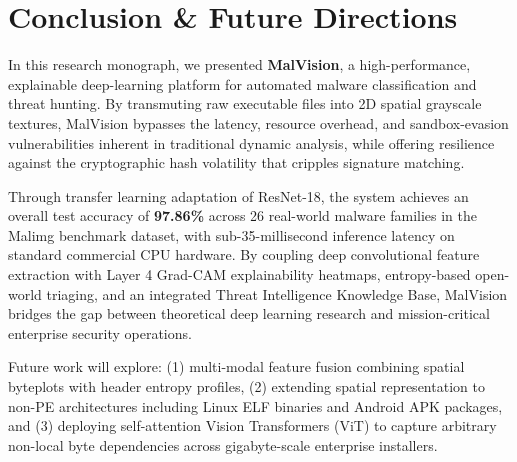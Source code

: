 \documentclass[journal,10pt,twocolumn]{IEEEtran}
\begin{document}
\section{Conclusion \& Future Directions}
In this research monograph, we presented \textbf{MalVision}, a high-performance, explainable deep-learning platform for automated malware classification and threat hunting. By transmuting raw executable files into 2D spatial grayscale textures, MalVision bypasses the latency, resource overhead, and sandbox-evasion vulnerabilities inherent in traditional dynamic analysis, while offering resilience against the cryptographic hash volatility that cripples signature matching.

Through transfer learning adaptation of ResNet-18, the system achieves an overall test accuracy of \textbf{97.86\%} across 26 real-world malware families in the Malimg benchmark dataset, with sub-35-millisecond inference latency on standard commercial CPU hardware. By coupling deep convolutional feature extraction with Layer 4 Grad-CAM explainability heatmaps, entropy-based open-world triaging, and an integrated Threat Intelligence Knowledge Base, MalVision bridges the gap between theoretical deep learning research and mission-critical enterprise security operations.

Future work will explore: (1) multi-modal feature fusion combining spatial byteplots with header entropy profiles, (2) extending spatial representation to non-PE architectures including Linux ELF binaries and Android APK packages, and (3) deploying self-attention Vision Transformers (ViT) to capture arbitrary non-local byte dependencies across gigabyte-scale enterprise installers.
\end{document}
